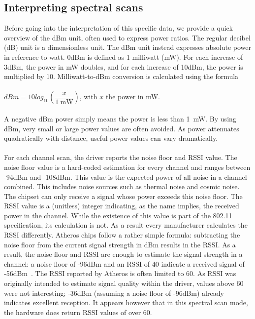 \documentclass[a4paper, 11pt]{article}
\begin{document}
\subsection{Interpreting spectral scans} \label{sec:interpret}
Before going into the interpretation of this specific data, we provide a quick overview of the dBm unit, often used to express power ratios. The regular decibel (dB) unit is a dimensionless unit. The dBm unit instead expresses absolute power in reference to watt. 0dBm is defined as 1 milliwatt (mW). For each increase of 3dBm, the power in mW doubles, and for each increase of 10dBm, the power is multiplied by 10. Milliwatt-to-dBm conversion is calculated using the formula\\ \\ $dBm = 10 log_{10}(\dfrac{x}{\SI{1}{\milli\watt}})$, with $x$ the power in mW.\\ \\ A negative dBm power simply means the power is less than \SI{1}{\milli\watt}. By using dBm, very small or large power values are often avoided. As power attenuates quadratically with distance, useful power values can vary dramatically.\\\\
For each channel scan, the driver reports the noise floor and RSSI value. The noise floor value is a hard-coded estimation for every channel and ranges between -94dBm and -108dBm. This value is the expected power of all noise in a channel combined. This includes noise sources such as thermal noise and cosmic noise. The chipset can only receive a signal whose power exceeds this noise floor. The RSSI value is a (unitless) integer indicating, as the name implies, the received power in the channel. While the existence of this value is part of the 802.11 specification, its calculation is not. As a result every manufacturer calculates the RSSI differently. Atheros chips follow a rather simple formula: subtracting the noise floor from the current signal strength in dBm results in the RSSI. As a result, the noise floor and RSSI are enough to estimate the signal strength in a channel: a noise floor of -96dBm and an RSSI of 40 indicate a received signal of -56dBm~\cite{rssi-calc}. The RSSI reported by Atheros is often limited to 60. As RSSI was originally intended to estimate signal quality within the driver, values above 60 were not interesting; -36dBm (assuming a noise floor of -96dBm) already indicates excellent reception. It appears however that in this spectral scan mode, the hardware does return RSSI values of over 60. \\
\end{document}
